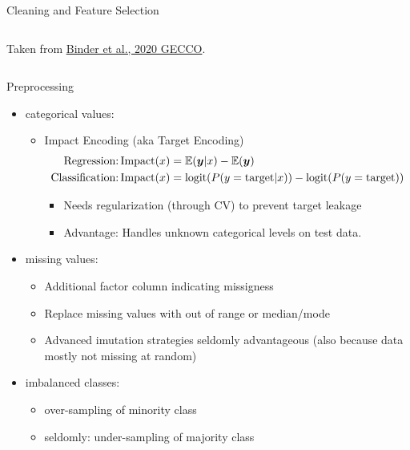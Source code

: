 \begin{frame}{Cleaning and Feature Selection}
\begin{columns}
\begin{column}{0.3\textwidth}
\begin{center}
          {\tiny Taken from \href{https://doi.org/10.1145/3377930.3389815}{Binder et al., 2020 GECCO}.}
        \end{center}
      \end{column}
    \end{columns}
\end{frame}

\begin{frame}{Preprocessing}
  \begin{itemize}
    \item categorical values:
    \begin{itemize}
      \item Impact Encoding (aka Target Encoding) \\
      \vspace*{-0.5cm}  
        \begin{align*}
          \text{Regression:} \operatorname{Impact}(x) &= \operatorname*{\mathbb{E}}(\bm{y} | x) - \operatorname*{\mathbb{E}}(\bm{y}) \\
          \text{Classification:} \operatorname{Impact}(x) &= \operatorname{logit}(P( y = \text{target} | x)) - \operatorname{logit}(P( y = \text{target}))
        \end{align*}
        \vspace*{-0.5cm}  
        \begin{itemize}
          \item Needs regularization (through CV) to prevent target leakage 
          \item Advantage: Handles unknown categorical levels on test data.
        \end{itemize}
    \end{itemize}
    \item missing values:
    \begin{itemize}
      \item Additional factor column indicating missigness
      \item Replace missing values with out of range or median/mode
      \item Advanced imutation strategies seldomly advantageous (also because data mostly not missing at random)
    \end{itemize}
    \item imbalanced classes:
    \begin{itemize}
      \item over-sampling of minority class
      \item seldomly: under-sampling of majority class
    \end{itemize}
  \end{itemize}
\end{frame}

